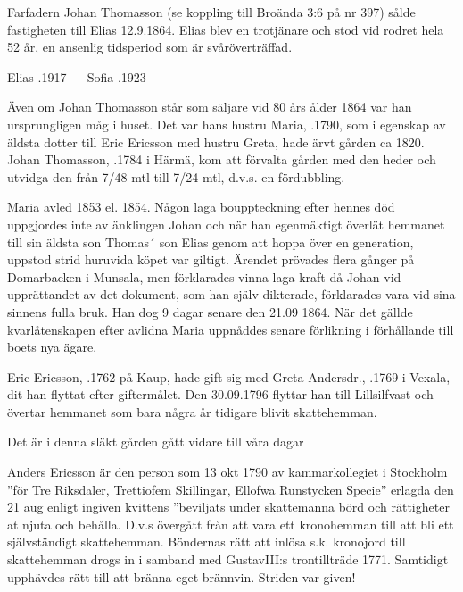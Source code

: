 Farfadern Johan Thomasson (se koppling till Broända 3:6 på nr 397) sålde fastigheten till Elias 12.9.1864. Elias blev en trotjänare och stod vid rodret hela 52 år, en ansenlig tidsperiod som är svåröverträffad.

Elias .1917 --- Sofia .1923


Även om Johan Thomasson står som säljare vid 80 års ålder 1864 var han ursprungligen måg i huset. Det var hans hustru Maria, .1790, som i egenskap av äldsta dotter till Eric Ericsson med hustru Greta, hade ärvt gården ca 1820. Johan Thomasson, .1784 i Härmä, kom att förvalta gården med den heder och utvidga den från 7/48 mtl till 7/24 mtl, d.v.s. en fördubbling.

Maria avled 1853 el. 1854. Någon laga bouppteckning efter hennes död uppgjordes inte av änklingen Johan och när han egenmäktigt överlät hemmanet till sin äldsta son Thomas´ son Elias genom att hoppa över en generation, uppstod strid huruvida köpet var giltigt. Ärendet prövades flera gånger på Domarbacken i Munsala, men förklarades vinna laga kraft då Johan vid upprättandet av det dokument, som han själv dikterade, förklarades vara vid sina sinnens fulla bruk. Han dog 9 dagar senare den 21.09 1864. När det gällde kvarlåtenskapen efter avlidna Maria uppnåddes senare förlikning i förhållande till boets nya ägare.


Eric Ericsson, .1762 på Kaup, hade gift sig med Greta Andersdr., .1769 i Vexala, dit han flyttat efter giftermålet. Den 30.09.1796 flyttar han till Lillsilfvast och övertar hemmanet som bara några år tidigare blivit skattehemman.
\begin{jhchildren}
  \item {}
  \item {}
  \item {}
\end{jhchildren}
Det är i denna släkt gården gått vidare till våra dagar


Anders Ericsson är den person som 13 okt 1790 av kammarkollegiet i Stockholm ”för Tre Riksdaler, Trettiofem Skillingar, Ellofwa Runstycken Specie” erlagda den 21 aug enligt ingiven kvittens ”beviljats under skattemanna  börd och rättigheter at njuta och behålla. D.v.s övergått från att vara ett kronohemman till att bli ett självständigt skattehemman. Böndernas rätt att inlösa s.k. kronojord till skattehemman drogs in i samband med GustavIII:s trontillträde 1771. Samtidigt upphävdes rätt till att bränna eget brännvin. Striden var given!

